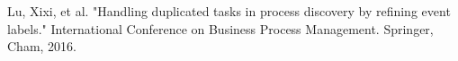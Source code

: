 \documentclass[notitlepage]{article}
\begin{document}


\begin{thebibliography}{5}
Lu, Xixi, et al. "Handling duplicated tasks in process discovery by refining event labels." International Conference on Business Process Management. Springer, Cham, 2016.










\end{thebibliography}
\end{document}
